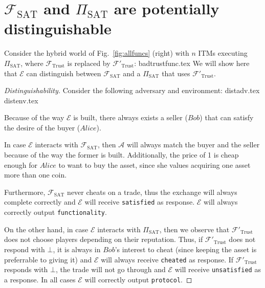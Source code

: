 \section{$\mathcal{F}_{\mathrm{SAT}}$ and $\Pi_{\mathrm{SAT}}$ are potentially
distinguishable}
  Consider the hybrid world of Fig.~\ref{fig:allfuncs} (right) with $n$ ITMs executing
  $\Pi_{\mathrm{SAT}}$, where $\mathcal{F}_{\mathrm{Trust}}$ is replaced by
  $\mathcal{F}'_{\mathrm{Trust}}$:
  {badtrustfunc.tex}
  We will show here that $\mathcal{E}$ can distinguish between
  $\mathcal{F}_{\mathrm{SAT}}$ and a $\Pi_{\mathrm{SAT}}$ that uses
  $\mathcal{F}'_{\mathrm{Trust}}$.
  \begin{proof}[Distinguishability]
    Consider the following adversary and environment:
    {distadv.tex}
    {distenv.tex}

    Because of the way $\mathcal{E}$ is built, there always exists a seller ($Bob$) that
    can satisfy the desire of the buyer ($Alice$).

    In case $\mathcal{E}$ interacts with $\mathcal{F}_{\mathrm{SAT}}$, then $\mathcal{A}$
    will always match the buyer and the seller because of the way the former is built.
    Additionally, the price of 1 is cheap enough for $Alice$ to want to buy the asset,
    since she values acquiring one asset more than one coin.

    Furthermore, $\mathcal{F}_{\mathrm{SAT}}$ never cheats on a trade, thus the exchange
    will always complete correctly and $\mathcal{E}$ will receive \texttt{satisfied} as
    response. $\mathcal{E}$ will always correctly output \texttt{functionality}.

    On the other hand, in case $\mathcal{E}$ interacts with $\Pi_{\mathrm{SAT}}$, then we
    observe that $\mathcal{F}'_{\mathrm{Trust}}$ does not choose players depending on
    their reputation.  Thus, if $\mathcal{F}'_{\mathrm{Trust}}$ does not respond with
    $\bot$, it is always in $Bob$'s interest to cheat (since keeping the asset is
    preferrable to giving it) and $\mathcal{E}$ will always receive \texttt{cheated} as
    response. If $\mathcal{F}'_{\mathrm{Trust}}$ responds with $\bot$, the trade will not
    go through and $\mathcal{E}$ will receive \texttt{unsatisfied} as a response. In all
    cases $\mathcal{E}$ will correctly output \texttt{protocol}.
  \end{proof}
